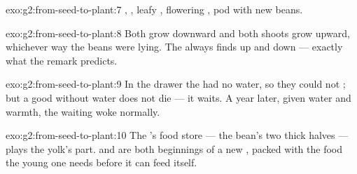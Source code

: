 \begin{solution}{exo:g2:from-seed-to-plant:7}
, , leafy , flowering , pod with new beans.
\end{solution}

\begin{solution}{exo:g2:from-seed-to-plant:8}
Both  grow downward and both shoots grow upward, whichever
way the beans were lying. The  always finds up and down
--- exactly what the remark predicts.
\end{solution}

\begin{solution}{exo:g2:from-seed-to-plant:9}
In the drawer the  had no water, so they could not ;
but a good  without water does not die --- it waits. A year
later, given water and warmth, the waiting  woke normally.
\end{solution}

\begin{solution}{exo:g2:from-seed-to-plant:10}
The 's food store --- the bean's two thick halves --- plays
the yolk's part.  and  are both beginnings of a new , packed with the food the young one needs before it can
feed itself.
\end{solution}
